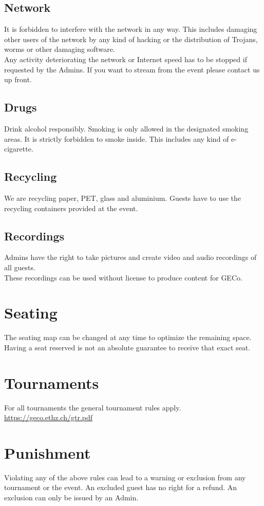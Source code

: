 \documentclass{article}
\begin{document}
\subsection{Network}
It is forbidden to interfere with the network in any way. This includes damaging other users of the network by any kind of hacking or the distribution of Trojans, worms or other damaging software.\\
Any activity deteriorating the network or Internet speed has to be stopped if requested by the Admins. If you want to stream from the event please contact us up front.


\subsection{Drugs}
Drink alcohol responsibly. 
Smoking is only allowed in the designated smoking areas.
It is strictly forbidden to smoke inside.
This includes any kind of e-cigarette. 

\subsection{Recycling}
We are recycling paper, PET, glass and aluminium. Guests have to use the recycling containers provided at the event.


\subsection{Recordings}
Admins have the right to take pictures and create video and audio recordings of all guests.\\
These recordings can be used without license to produce content for GECo.


\section{Seating}
The seating map can be changed at any time to optimize the remaining space.
Having a seat reserved is not an absolute guarantee to receive that exact seat.

\section{Tournaments}
For all tournaments the general tournament rules apply. \\ \url{https://geco.ethz.ch/gtr.pdf}


\section{Punishment}
Violating any of the above rules can lead to a warning or exclusion from any tournament or the event.
An excluded guest has no right for a refund.
An exclusion can only be issued by an Admin.
\end{document}
